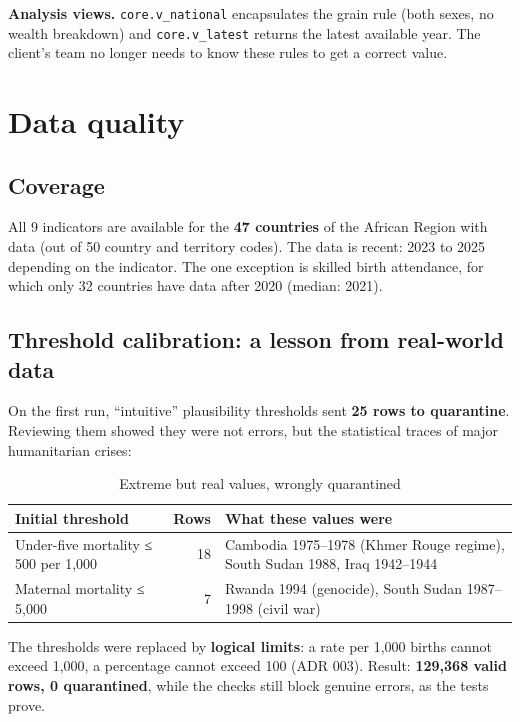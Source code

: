 \documentclass[11pt, a4paper, oneside, headings=normal, numbers=noenddot, DIV=12]{scrartcl}
\begin{document}
\textbf{Analysis views.} \texttt{core.v\_national} encapsulates the grain rule (both sexes, no wealth breakdown) and \texttt{core.v\_latest}
returns the latest available year. The client's team no longer needs to know these rules to get a correct value.

\section{Data quality}

\subsection{Coverage}
All 9 indicators are available for the \textbf{47 countries} of the African Region with data (out of 50 country and territory codes).
The data is recent: 2023 to 2025 depending on the indicator. The one exception is skilled birth attendance, for which only 32 countries have
data after 2020 (median: 2021).

\subsection{Threshold calibration: a lesson from real-world data}
On the first run, ``intuitive'' plausibility thresholds sent \textbf{25 rows to quarantine}. Reviewing them showed they were not errors,
but the statistical traces of major humanitarian crises:

\begin{table}[H]
\centering\small
\begin{tabularx}{\linewidth}{@{}L{4.6cm} r Y@{}}
\toprule
\textbf{Initial threshold} & \textbf{Rows} & \textbf{What these values were} \\
\midrule
Under-five mortality ≤ 500 per 1,000 & 18 & Cambodia 1975–1978 (Khmer Rouge regime), South Sudan 1988, Iraq 1942–1944 \\
Maternal mortality ≤ 5,000 & 7 & Rwanda 1994 (genocide), South Sudan 1987–1998 (civil war) \\
\bottomrule
\end{tabularx}
\caption{Extreme but real values, wrongly quarantined}
\end{table}

The thresholds were replaced by \textbf{logical limits}: a rate per 1,000 births cannot exceed 1,000, a percentage cannot exceed 100 (ADR 003).
Result: \textbf{129,368 valid rows, 0 quarantined}, while the checks still block genuine errors, as the tests prove.
\end{document}

